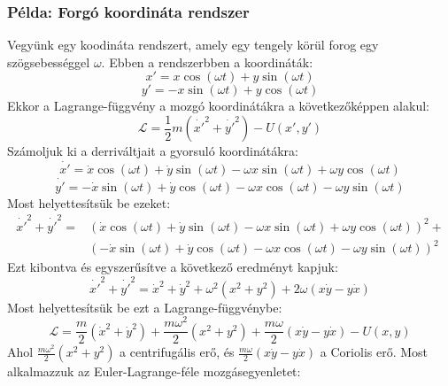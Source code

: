 \documentclass[../main.tex]{subfiles}
\begin{document}
\subsubsection*{Példa: Forgó koordináta rendszer}
Vegyünk egy koodináta rendszert, amely egy tengely körül forog egy szögsebességgel $\omega$. Ebben a rendszerbben a koordináták:
\begin{equation}
    x' = x \cos(\omega t) + y \sin(\omega t)
\end{equation}
\begin{equation}
    y' = -x \sin(\omega t) + y \cos(\omega t)
\end{equation}
Ekkor a Lagrange-függvény a mozgó koordinátákra a következőképpen alakul:
\begin{equation}
    \mathcal{L} = \frac{1}{2}m(\dot{x'}^2 + \dot{y'}^2) - U(x', y')
\end{equation}
Számoljuk ki a derriváltjait a gyorsuló koordinátákra:
\begin{equation}
    \dot{x'} = \dot{x} \cos(\omega t) + \dot{y} \sin(\omega t) - \omega x \sin(\omega t) + \omega y \cos(\omega t)
\end{equation}
\begin{equation}
    \dot{y'} = -\dot{x} \sin(\omega t) + \dot{y} \cos(\omega t) - \omega x \cos(\omega t) - \omega y \sin(\omega t)
\end{equation}
Most helyettesítsük be ezeket:
\begin{equation}
    \begin{aligned}
        \dot{x'}^2 + \dot{y'}^2 = & (\dot{x} \cos(\omega t) + \dot{y} \sin(\omega t) - \omega x \sin(\omega t) + \omega y \cos(\omega t))^2 + \\
        & (-\dot{x} \sin(\omega t) + \dot{y} \cos(\omega t) - \omega x \cos(\omega t) - \omega y \sin(\omega t))^2
    \end{aligned}
\end{equation}
Ezt kibontva és egyszerűsítve a következő eredményt kapjuk:
\begin{equation}
    \dot{x'}^2 + \dot{y'}^2 = \dot{x}^2 + \dot{y}^2 + \omega^2 (x^2 + y^2) + 2\omega (x \dot{y} - y \dot{x})
\end{equation}
Most helyettesítsük be ezt a Lagrange-függvénybe:
\begin{equation}
    \mathcal{L} = \frac{m}{2}(\dot{x}^2 + \dot{y}^2) + \frac{m\omega^2}{2}(x^2 + y^2) + \frac{m\omega}{2}(x \dot{y} - y \dot{x}) - U(x, y)
\end{equation}
Ahol $\frac{m\omega^2}{2}(x^2 + y^2)$ a centrifugális erő, és $\frac{m\omega}{2}(x \dot{y} - y \dot{x})$ a Coriolis erő. Most alkalmazzuk az Euler-Lagrange-féle mozgásegyenletet:
\end{document}
